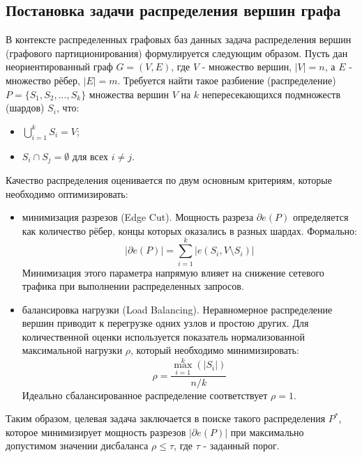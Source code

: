 \subsection{Постановка задачи распределения вершин графа}

В контексте распределенных графовых баз данных задача распределения вершин (графового партиционирования) формулируется следующим образом. Пусть дан неориентированный граф \(G = (V, E)\), где \(V\) - множество вершин, \(|V| = n\), а \(E\) - множество рёбер, \(|E| = m\). Требуется найти такое разбиение (распределение) \(P = \{S_1, S_2, ..., S_k\}\) множества вершин \(V\) на \(k\) непересекающихся подмножеств (шардов) \(S_i\), что:
\begin{itemize}
    \item \(\bigcup_{i=1}^{k} S_i = V\);
    \item \(S_i \cap S_j = \emptyset\) для всех \(i \neq j\).
\end{itemize}

Качество распределения оценивается по двум основным критериям, которые необходимо оптимизировать:
\begin{itemize}
    \item минимизация разрезов (Edge Cut). Мощность разреза \(\partial e(P)\) определяется как количество рёбер, концы которых оказались в разных шардах. Формально:
    $$
    |\partial e(P)| = \sum_{i=1}^{k} |e(S_i, V \setminus S_i)|
    $$
    Минимизация этого параметра напрямую влияет на снижение сетевого трафика при выполнении распределенных запросов.
    \item балансировка нагрузки (Load Balancing). Неравномерное распределение вершин приводит к перегрузке одних узлов и простою других. Для количественной оценки используется показатель нормализованной максимальной нагрузки \(\rho\), который необходимо минимизировать:
    $$
    \rho = \frac{\max_{i=1}^{k} (|S_i|)}{n/k}
    $$
    Идеально сбалансированное распределение соответствует \(\rho = 1\).
\end{itemize}
Таким образом, целевая задача заключается в поиске такого распределения \(P^*\), которое минимизирует мощность разрезов \(|\partial e(P)|\) при максимально допустимом значении дисбаланса \(\rho \leq \tau\), где \(\tau\) - заданный порог.
